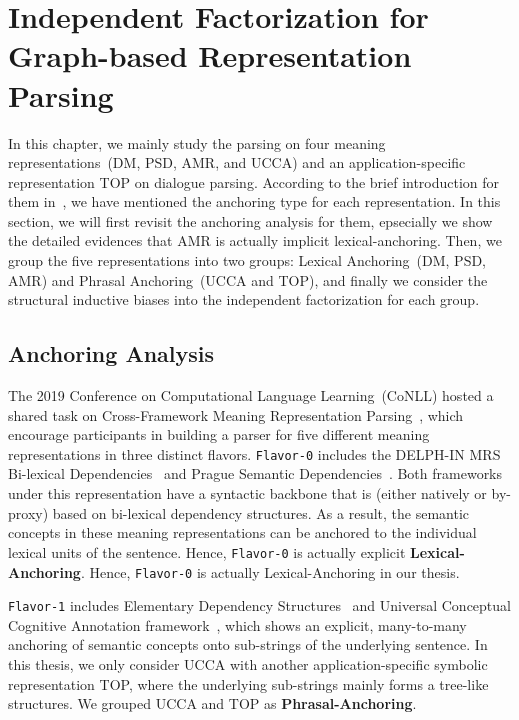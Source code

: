 \section{Independent Factorization for Graph-based Representation Parsing}
\label{sec:lex-phr:factorization-analysis}

In this chapter, we mainly study the parsing on four meaning
representations~(DM, PSD, AMR, and UCCA) and an application-specific
representation TOP on dialogue parsing. According to the brief
introduction for them in~\label{ssec:bg:broad-mr}, we have mentioned
the anchoring type for each representation. In this section, we will
first revisit the anchoring analysis for them, epsecially we show the
detailed evidences that AMR is actually implicit
lexical-anchoring. Then, we group the five representations into two
groups: Lexical Anchoring~(DM, PSD, AMR) and Phrasal Anchoring~(UCCA
and TOP), and finally we consider the structural inductive biases into
the independent factorization for each group.

\subsection{Anchoring Analysis}
\label{ssec:lex-phr:anchoring-analysis}
The 2019 Conference on Computational Language Learning~(CoNLL) hosted
a shared task on Cross-Framework Meaning Representation
Parsing~\cite[MRP 2019,][]{Oep:Abe:Haj:19}, which encourage
participants in building a parser for five different meaning
representations in three distinct flavors. \texttt{Flavor-0} includes
the DELPH-IN MRS Bi-lexical Dependencies~\cite[DM,][]{ivanova2012did}
and Prague Semantic
Dependencies~\cite[PSD,][]{hajic2012announcing,miyao2014house}. Both
frameworks under this representation have a syntactic backbone that is
(either natively or by-proxy) based on bi-lexical dependency
structures. As a result, the semantic concepts in these meaning
representations can be anchored to the individual lexical units of the
sentence. Hence, \texttt{Flavor-0} is actually explicit
\textbf{Lexical-Anchoring}. Hence, \texttt{Flavor-0} is actually
Lexical-Anchoring in our thesis.

\texttt{Flavor-1} includes Elementary Dependency
Structures~\cite[EDS,][]{oepen2006discriminant} and Universal
Conceptual Cognitive Annotation
framework~\cite[UCCA,][]{abend2013universal}, which shows an explicit,
many-to-many anchoring of semantic concepts onto sub-strings of the
underlying sentence. In this thesis, we only consider UCCA with
another application-specific symbolic representation TOP, where the
underlying sub-strings mainly forms a tree-like structures. We grouped
UCCA and TOP as \textbf{Phrasal-Anchoring}.


